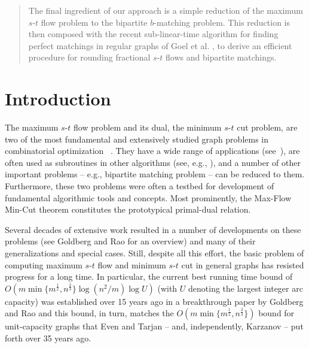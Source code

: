 \documentclass[11pt, letterpaper]{article}
\newcommand{\bb}{\boldsymbol{\mathit{b}}}
\begin{document}
\begin{abstract}
The final ingredient of our approach is a simple reduction of the maximum $s$-$t$ flow problem to the bipartite $\bb$-matching problem. This reduction is then composed with the recent sub-linear-time algorithm for finding perfect matchings in regular graphs of Goel et al. \cite{GoelKK10}, to derive an efficient procedure for rounding fractional $s$-$t$ flows and bipartite matchings. 

 

\end{abstract}

\thispagestyle{empty}
\newpage
\setcounter{page}{1}







\section{Introduction}


  The maximum $s$-$t$ flow problem and its dual, the minimum $s$-$t$ cut problem,
  are two of the most fundamental and extensively studied graph problems in combinatorial optimization ~\cite{Schrijver03,AhujaMO93}. They have a wide range of applications (see~\cite{AhujaMOR95}), are often used as subroutines in other algorithms (see, e.g., \cite{AroraHK05,Sherman09}), and a number of other important problems  -- e.g., bipartite matching problem \cite{CormenLRS09} -- can be reduced to them.  Furthermore, these two problems were often a testbed for development of fundamental algorithmic tools and concepts. Most prominently, the Max-Flow Min-Cut theorem \cite{EliasFS56,FordF56} constitutes the prototypical primal-dual relation.
  
  Several decades of extensive work resulted in a number of developments on these problems (see Goldberg and Rao \cite{GoldbergR98} for an overview) and  many of their generalizations and special cases. Still, despite all this effort, the basic problem of computing maximum $s$-$t$ flow and minimum $s$-$t$ cut in general graphs has resisted progress for a long time. In particular, the current best running time bound of $O(m\min\{m^{\frac{1}{2}},n^{\frac{2}{3}}\}\log (n^2/m) \log U)$ (with $U$ denoting the largest integer arc capacity) was established over 15 years ago in a breakthrough paper by Goldberg and Rao \cite{GoldbergR98} and this bound, in turn, matches the $O(m\min\{m^{\frac{1}{2}},n^{\frac{2}{3}}\})$ bound for unit-capacity graphs that Even and Tarjan \cite{EvenT75} -- and, independently, Karzanov \cite{Karzanov73} -- put forth over 35 years ago. 
  
\end{document}
